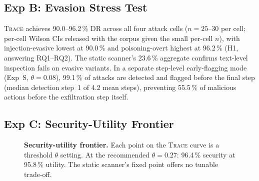\documentclass[conference]{IEEEtran}
\begin{document}
\subsection{Exp B: Evasion Stress Test}
\label{sec:exp_b}

\textsc{Trace} achieves 90.0--96.2\,\% DR across all four attack cells
($n{=}25$--$30$ per cell; per-cell Wilson CIs released with the
corpus given the small per-cell $n$), with injection-evasive lowest
at 90.0\,\% and poisoning-overt highest at 96.2\,\% (H1, answering
RQ1--RQ2). The static scanner's 23.6\,\% aggregate confirms
text-level inspection fails on evasive variants. In a separate
step-level early-flagging mode (Exp~S, $\theta{=}0.08$), 99.1\,\% of
attacks are detected and flagged before the final step (median
detection step~1 of 4.2 mean steps), preventing 55.5\,\% of malicious
actions before the exfiltration step itself.

\subsection{Exp C: Security-Utility Frontier}
\label{sec:exp_c}

\begin{figure}[t]
\centering
{}
\caption{\textbf{Security-utility frontier.}  Each point on the
  \textsc{Trace} curve is a threshold $\theta$ setting.  At the
  recommended $\theta=0.27$: 96.4\,\% security at 95.8\,\% utility.
  The static scanner's fixed point offers no tunable trade-off.}
\label{fig:frontier}
\end{figure}
\end{document}
